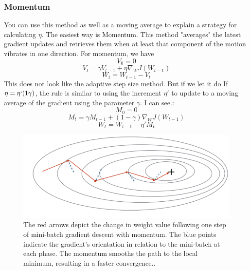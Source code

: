 \subsubsection{Momentum}
You can use this method as well as a moving average to explain a strategy for calculating $\eta$. The easiest way is Momentum. This method "averages" the latest gradient updates and retrieves them when at least  that component of the motion vibrates in one direction. For momentum, we have\\
\begin{equation*}
      V_0 = 0
\end{equation*}
\begin{equation*}
         V_t = \gamma V_{t-1} + \eta \nabla_W J (W_{t-1})
\end{equation*}
\begin{equation*}
         W_t =  W_{t-1} - V_t
\end{equation*}
This does not look like the adaptive step size method. But if we let it do 
 If $\eta = \eta`(1 \gamma)$, the rule is similar to using the increment $\eta'$ to update to a moving average of the gradient using the parameter $\gamma$. I can see.:
\begin{equation*}
    M_0 = 0
\end{equation*}
\begin{equation*}
           M_t = \gamma M_{t-1} + (1-\gamma) \nabla_W J (W_{t-1})
\end{equation*}
\begin{equation*}
         W_t =  W_{t-1} - \eta'M_t
\end{equation*}

\begin{figure}[H]
    \centering
    \includegraphics[scale=0.3]{Figure/ml__11.png}
    \caption{The red arrows depict the change in weight value following one step of mini-batch gradient descent with momentum. The blue points indicate the gradient's orientation in relation to the mini-batch at each phase. The momentum smooths the path to the local minimum, resulting in a faster convergence..}
    \label{fig:my_label}
\end{figure}


